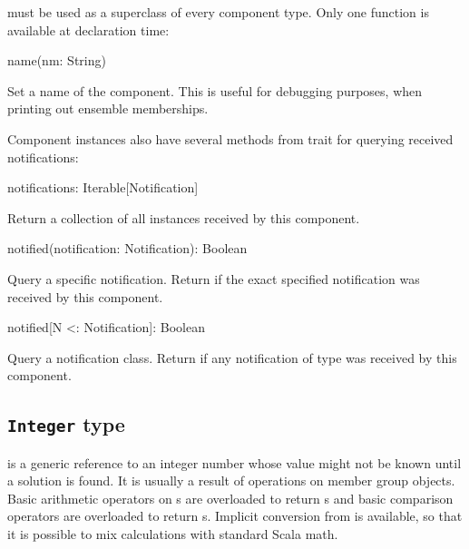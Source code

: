  must be used as a superclass of every component type. Only one function
is available at declaration time:

\begin{dslsig}
name(nm: String)
\end{dslsig}
\begin{dsldesc}
    Set a name of the component. This is useful for debugging purposes, when printing
    out ensemble memberships.
\end{dsldesc}

\medskip

\noindent
Component instances also have several methods from trait  for querying
received notifications:

\begin{dslsig}
notifications: Iterable[Notification]
\end{dslsig}
\begin{dsldesc}
    Return a collection of all  instances received by this component.
\end{dsldesc}

\begin{dslsig}
notified(notification: Notification): Boolean
\end{dslsig}
\begin{dsldesc}
    Query a specific notification. Return  if the exact specified notification
    was received by this component.
\end{dsldesc}

\begin{dslsig}
notified[N <: Notification]: Boolean
\end{dslsig}
\begin{dsldesc}
    Query a notification class. Return  if any notification of type  was
    received by this component.
\end{dsldesc}


\subsection{\texttt{Integer} type}

 is a generic reference to an integer number whose value might not be known
until a solution is found. It is usually a result of operations on member group objects.
Basic arithmetic operators on s are overloaded to return s and
basic comparison operators are overloaded to return s. Implicit conversion
from  is available, so that it is possible to mix  calculations with
standard Scala math.

